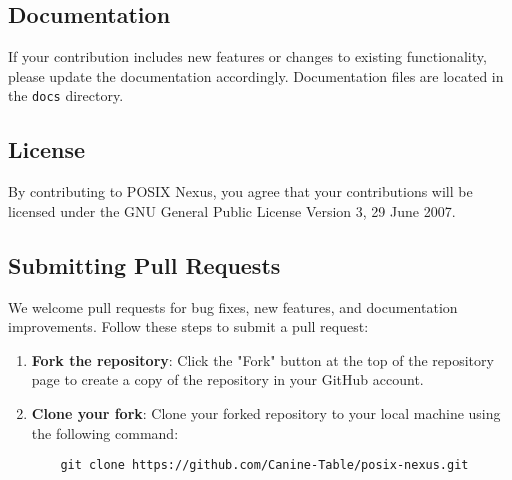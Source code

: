 \subsection{Documentation}
If your contribution includes new features or changes to existing functionality, please update the documentation accordingly. Documentation files are located in the \texttt{docs} directory.

\subsection{License}
By contributing to POSIX Nexus, you agree that your contributions will be licensed under the GNU General Public License Version 3, 29 June 2007.

\subsection{Submitting Pull Requests}
We welcome pull requests for bug fixes, new features, and documentation improvements. Follow these steps to submit a pull request:
\begin{enumerate}
    \item \textbf{Fork the repository}: Click the "Fork" button at the top of the repository page to create a copy of the repository in your GitHub account.
    \item \textbf{Clone your fork}: Clone your forked repository to your local machine using the following command:
    \begin{lstlisting}
    git clone https://github.com/Canine-Table/posix-nexus.git
    \end{lstlisting}
\end{enumerate}
\newpage